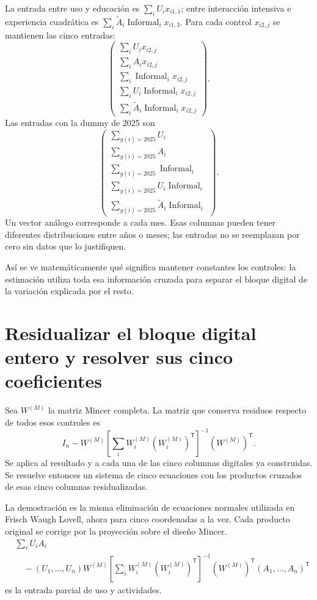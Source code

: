 \documentclass[11pt,a4paper]{article}
\begin{document}
La entrada entre uso y educación es $\sum_iU_ix_{i1,1}$; entre interacción intensiva e experiencia cuadrática es
$\sum_i\widetilde A_i\operatorname{Informal}_ix_{i1,3}$.
Para cada control $x_{i2,j}$ se mantienen las cinco entradas:
\[
\begin{pmatrix}
\sum_iU_ix_{i2,j}\\
\sum_iA_ix_{i2,j}\\
\sum_i\operatorname{Informal}_ix_{i2,j}\\
\sum_iU_i\operatorname{Informal}_ix_{i2,j}\\
\sum_i\widetilde A_i\operatorname{Informal}_ix_{i2,j}
\end{pmatrix}.
\]
Las entradas con la dummy de 2025 son
\[
\begin{pmatrix}
\sum_{y(i)=2025}U_i\\
\sum_{y(i)=2025}A_i\\
\sum_{y(i)=2025}\operatorname{Informal}_i\\
\sum_{y(i)=2025}U_i\operatorname{Informal}_i\\
\sum_{y(i)=2025}\widetilde A_i\operatorname{Informal}_i
\end{pmatrix}.
\]
Un vector análogo corresponde a cada mes. Esas columnas pueden tener diferentes distribuciones entre años o meses; las entradas no se reemplazan por cero sin datos que lo justifiquen.

Así se ve matemáticamente qué significa mantener constantes los controles: la estimación utiliza toda esa información cruzada para separar el bloque digital de la variación explicada por el resto.

\clearpage
\section{Residualizar el bloque digital entero y resolver sus cinco coeficientes}

Sea $W^{(M)}$ la matriz Mincer completa. La matriz que conserva residuos respecto de todos esos controles es
\[
I_n-W^{(M)}
\left[\sum_iW_i^{(M)}(W_i^{(M)})^{\mathsf T}\right]^{-1}
(W^{(M)})^{\mathsf T}.
\]
Se aplica al resultado y a cada una de las cinco columnas digitales ya construidas. Se resuelve entonces un sistema de cinco ecuaciones con los productos cruzados de esas cinco columnas residualizadas.

La demostración es la misma eliminación de ecuaciones normales utilizada en Frisch Waugh Lovell, ahora para cinco coordenadas a la vez. Cada producto original se corrige por la proyección sobre el diseño Mincer.
\[
\begin{aligned}
&\sum_iU_iA_i\\
&\quad-
(U_1,\ldots,U_n)W^{(M)}
\left[\sum_iW_i^{(M)}(W_i^{(M)})^{\mathsf T}\right]^{-1}
(W^{(M)})^{\mathsf T}(A_1,\ldots,A_n)^{\mathsf T}
\end{aligned}
\]
es la entrada parcial de uso y actividades.
\end{document}
